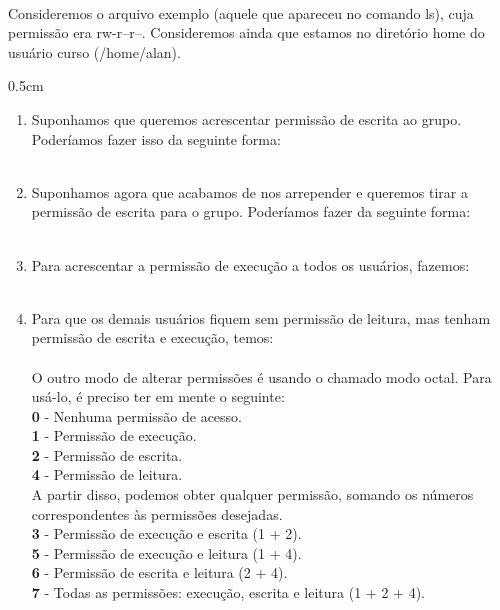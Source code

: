 \begin{refsection}
\\
Consideremos o arquivo exemplo (aquele que apareceu no comando ls), cuja permissão era rw-r--r--. Consideremos ainda que estamos no diretório home do usuário curso (/home/alan).
 \begin {myindentpar}{0.5cm}
 \begin{enumerate}[\itshape i.]

\item{Suponhamos que queremos acrescentar permissão de escrita ao grupo. Poderíamos fazer isso da seguinte forma:}
\\
 \\
\item{Suponhamos agora que acabamos de nos arrepender e queremos tirar a permissão de escrita para o grupo. Poderíamos fazer da seguinte forma:}
\\
 \\
\item{Para acrescentar a permissão de execução a todos os usuários, fazemos:}
\\
 \\
\item{Para que os demais usuários fiquem sem permissão de leitura, mas tenham permissão de escrita e execução, temos:}
\\
 \\

O outro modo de alterar permissões é usando o chamado modo octal. Para usá-lo, é preciso ter em mente o seguinte:\\

\indent\textbf{0} - Nenhuma permissão de acesso.\\
\indent\textbf{1} - Permissão de execução.\\
\indent\textbf{2} - Permissão de escrita.\\
\indent\textbf{4} - Permissão de leitura.\\

A partir disso, podemos obter qualquer permissão, somando os números correspondentes às permissões desejadas.\\

\indent\textbf{3} - Permissão de execução e escrita (1 + 2).\\
\indent\textbf{5} - Permissão de execução e leitura (1 + 4).\\
\indent\textbf{6} - Permissão de escrita e leitura (2 + 4).\\
\indent\textbf{7} - Todas as permissões: execução, escrita e leitura (1 + 2 + 4).\\


\end{enumerate}
\end{myindentpar}
\end{refsection}
